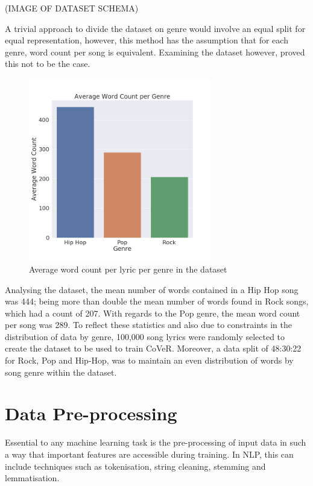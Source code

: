 \noindent
\newline
(IMAGE OF DATASET SCHEMA)

\noindent
\newline
A trivial approach to divide the dataset on genre would involve an equal split for equal representation, however, this method has the assumption that for each genre, word count per song is equivalent. Examining the dataset however, proved this not to be the case.
\begin{figure}[h]
	\includegraphics[width=8cm, height=8cm]{./figures/fig6}
	\centering
	\caption{Average word count per lyric per genre in the dataset}
	\label{fig:fig6}
\end{figure}

\noindent
\newline
Analysing the dataset, the mean number of words contained in a Hip Hop song was 444; being more than double the mean number of words found in Rock songs, which had a count of 207. With regards to the Pop genre, the mean word count per song was 289. To reflect these statistics and also due to constraints in the distribution of data by genre, 100,000 song lyrics were randomly selected to create the dataset to be used to train CoVeR. Moreover, a data split of 48:30:22 for Rock, Pop and Hip-Hop, was to maintain an even distribution of words by song genre within the dataset.
\section{Data Pre-processing}
Essential to any machine learning task is the pre-processing of input data in such a way that important features are accessible during training. In NLP, this can include techniques such as tokenisation, string cleaning, stemming and lemmatisation.

